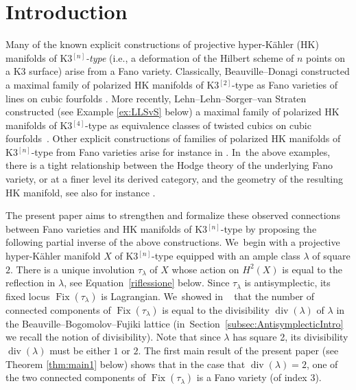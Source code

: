 \documentclass[11pt]{article}
\newcommand{\ie}{i.e.,\xspace}
\newcommand{\HK}{\textup{HK}\xspace}
\DeclareMathOperator{\divisore}{div}\let\div\divisore
\DeclareMathOperator{\Fix}{Fix}
\theoremstyle{definition}
\begin{document}
\section{Introduction}\label{sec:intro}

Many of the known explicit constructions of projective hyper-Kähler (\HK) manifolds of K3$^{[n]}$\emph{-type} (\ie a deformation of the Hilbert scheme of $n$ points on a K3 surface) arise from a Fano variety.
Classically, Beauville--Donagi constructed a maximal family of polarized \HK manifolds of K3$^{[2]}$-type as Fano varieties of lines on cubic fourfolds \cite{BD:Fano}.
More recently, Lehn--Lehn--Sorger--van Straten constructed (see Example \ref{ex:LLSvS} below) a maximal family of polarized \HK manifolds of K3$^{[4]}$-type as equivalence classes of twisted cubics on cubic fourfolds~\cite{LLSvS:cubics}.
Other explicit constructions of families of polarized \HK manifolds of K3$^{[n]}$-type from Fano varieties arise for instance in \cite{DV:varieties,IM:Fano, DK:GMvarieties,IM:magicsquare,FM:Fano}. In~the above examples, there is a tight relationship between the Hodge theory of the underlying Fano variety, or at a finer level its derived category, and the geometry of the resulting \HK manifold, see also for instance \cite{BLMNPS:family,PPZ:GM,LPZ:twisted}.

The present paper aims to strengthen and formalize these observed connections between Fano varieties and \HK manifolds of K3$^{[n]}$-type by proposing the following partial inverse of the above constructions. We~begin with a projective hyper-Kähler manifold $X$ of K3$^{[n]}$-type equipped with an ample class $\lambda$ of square $2$. There is a unique involution $\tau_{\lambda}$ of $X$ whose action on $H^2(X)$ is equal to the reflection in $\lambda$, see Equation~\eqref{riflessione} below. Since $\tau_{\lambda}$ is antisymplectic, its fixed locus $\Fix(\tau_{\lambda})$ is Lagrangian. We~showed in ~\cite{involutions1} that the number of connected components of $\Fix(\tau_{\lambda})$ is equal to the divisibility $\divisore(\lambda)$ of $\lambda$ in the Beauville--Bogomolov--Fujiki lattice (in~Section~\ref{subsec:AntisymplecticIntro} we recall the notion of divisibility). Note that since $\lambda$ has square 2, its divisibility $\divisore(\lambda)$ must be either $1$ or $2$.
The first main result of the present paper (see Theorem \ref{thm:main1} below) shows that in the case that $\divisore(\lambda)=2$, one of the two connected components of $\Fix(\tau_{\lambda})$ is a Fano variety (of index 3).
\end{document}
